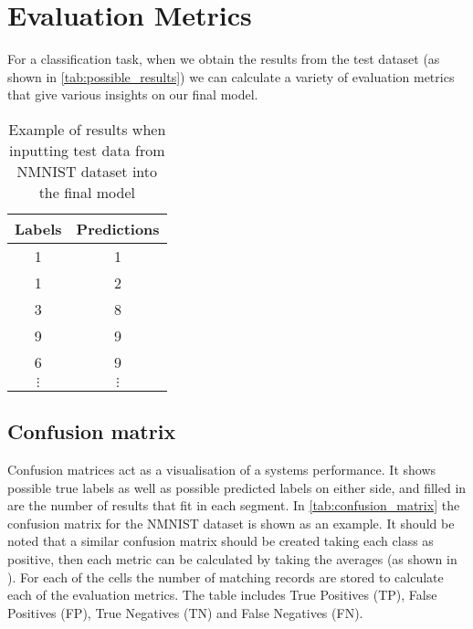 \section{Evaluation Metrics}

For a classification task, when we obtain the results from the test dataset (as shown in \autoref{tab:possible_results}) we can calculate a variety of evaluation metrics that give various insights on our final model.

\begin{table}[htb]
    \centering
    \begin{tabular}{|| c  | c ||}
        \hline
        Labels     & Predictions \\
        \hline \hline
        1          & 1           \\
        \hline
        1          & 2           \\
        \hline
        3          & 8           \\
        \hline
        9          & 9           \\
        \hline
        6          & 9           \\
        \hline
        $ \vdots $ & $ \vdots $  \\
    \end{tabular}
    \caption{Example of results when inputting test data from NMNIST dataset\cite{NMNIST} into the final model}
    \label{tab:possible_results}
\end{table}

\subsection{Confusion matrix}

Confusion matrices act as a visualisation of a systems performance. It shows possible true labels as well as possible predicted labels on either side, and filled in are the number of results that fit in each segment. In \autoref{tab:confusion_matrix} the confusion matrix for the NMNIST dataset is shown as an example. It should be noted that a similar confusion matrix should be created taking each class as positive, then each metric can be calculated by taking the averages (as shown in ). For each of the cells the number of matching records are stored to calculate each of the evaluation metrics. The table includes True Positives (TP), False Positives (FP), True Negatives (TN) and False Negatives (FN).

